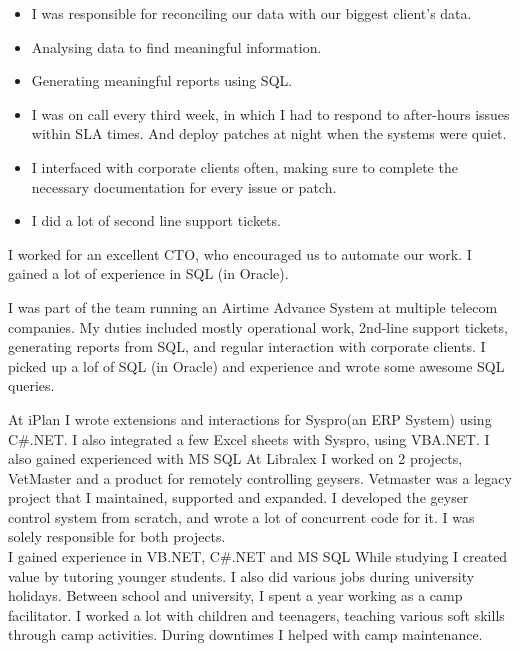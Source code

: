 \documentclass[a4paper]{twentysecondcv} %
\begin{document}
\begin{twenty}
{\begin{itemize}
        \item I was responsible for reconciling our data with our biggest client's data.
        \item Analysing data to find meaningful information.
        \item Generating meaningful reports using SQL.
        \item I was on call every third week, in which I had to respond to after-hours issues within SLA times. And deploy patches at night when the systems were quiet.
        \item I interfaced with corporate clients often, making sure to complete the necessary documentation for every issue or patch.
        \item I did a lot of second line support tickets.
    \end{itemize}
    I worked for an excellent CTO, who encouraged us to automate our work. I gained a lot of experience in SQL (in Oracle).}
    {I was part of the team running an Airtime Advance System at multiple telecom companies. My duties included mostly operational work, 2nd-line support tickets, generating reports from SQL, and regular interaction with corporate clients. I picked up a lof of SQL (in Oracle) and experience and wrote some awesome SQL queries.}
\end{twenty}

\newpage %

\makeprofile %

\begin{twenty}
    {At iPlan I wrote extensions and interactions for Syspro(an ERP System) using C\#.NET. I also integrated a few Excel sheets with Syspro, using VBA.NET. I also gained experienced with MS SQL}
    {At Libralex I worked on 2 projects, VetMaster and a product for remotely controlling geysers. Vetmaster was a legacy project that I maintained, supported and expanded. I developed the geyser control system from scratch, and wrote a lot of concurrent code for it. I was solely responsible for both projects.\\
    I gained experience in VB.NET, C\#.NET and MS SQL}
    {While studying I created value by tutoring younger students. I also did various jobs during university holidays.}
    {Between school and university, I spent a year working as a camp facilitator. I worked a lot with children and teenagers, teaching various soft skills through camp activities. During downtimes I helped with camp maintenance.}
\end{twenty}
\end{document}
